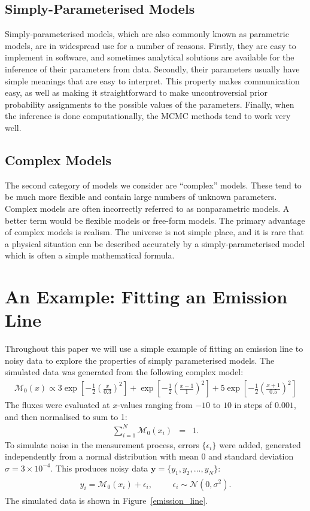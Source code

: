 \documentclass[letterpaper, 11pt]{article}
\begin{document}
\subsection{Simply-Parameterised Models}
Simply-parameterised models, which are also
commonly known as parametric models, are in widespread use for a number of reasons.
Firstly, they are easy to implement in software, and sometimes analytical
solutions are available for the inference of their parameters from data.
Secondly, their parameters usually have simple meanings that are easy to interpret.
This property makes communication easy, as well as making it straightforward to
make uncontroversial prior probability
assignments to the possible values of the parameters. Finally, when the inference
is done computationally, the MCMC methods tend to work very well.

\subsection{Complex Models}
The second category of models we consider are ``complex'' models. These tend to
be much more flexible and contain large numbers of unknown parameters. Complex
models are often incorrectly referred to as nonparametric models. A better term
would be flexible models or free-form models. The primary advantage of complex models is realism. The universe is not
simple place, and it is rare that a physical situation can be described accurately
by a simply-parameterised model which is often a simple mathematical formula.

\section{An Example: Fitting an Emission Line}
Throughout this paper we will use a simple example of fitting an emission line
to noisy data to explore the properties of simply parameterised models. The
simulated data was generated from the following complex model:
\begin{eqnarray}
\mathcal{M}_0(x) \propto 3\exp\left[-\frac{1}{2}\left(\frac{x}{0.3}\right)^2\right]
+ \exp\left[-\frac{1}{2}\left(\frac{x - 1}{1}\right)^2\right]
+ 5\exp\left[-\frac{1}{2}\left(\frac{x + 1}{0.5}\right)^2\right]
\end{eqnarray}
The fluxes were evaluated at $x$-values ranging from $-10$ to $10$ in steps
of $0.001$, and then normalised to sum to 1:
\begin{eqnarray}
\sum_{i=1}^N \mathcal{M}_0(x_i) &=& 1.
\end{eqnarray}
To simulate noise in the measurement process, errors $\{\epsilon_i\}$ were added, generated
independently from a normal distribution with mean 0 and standard deviation
$\sigma = 3 \times 10^{-4}$.
This produces noisy data $\mathbf{y} = \{y_1, y_2, ..., y_N\}$:
\begin{eqnarray}
\begin{array}{lccr}
y_i = \mathcal{M}_0(x_i) + \epsilon_i, & & & \epsilon_i \sim \mathcal{N}(0, \sigma^2).
\end{array}
\end{eqnarray}
The simulated data is shown in Figure~\ref{emission_line}.
\end{document}
